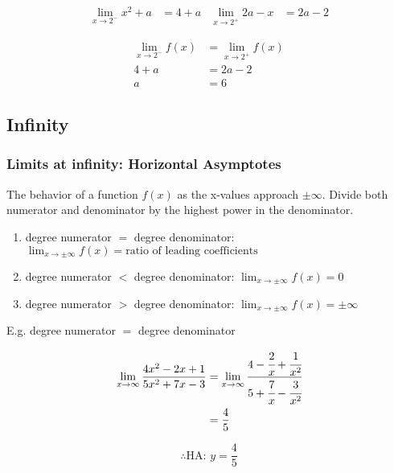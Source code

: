 \documentclass{article}
\begin{document}
\bigskip

\begin{align*}
    \lim_{x \to 2^{-}} x^{2} + a & = 4 + a & \lim_{x \to 2^{+}} 2a - x & = 2a - 2
\end{align*}

\begin{align*}
    \lim_{x \to 2^{-}} f(x) & = \lim_{x \to 2^{+}} f(x) \\
    4 + a                   & = 2a -2                   \\
    a                       & = 6
\end{align*}

\clearpage

\subsection{Infinity}

\subsubsection{Limits at infinity: Horizontal Asymptotes}

The behavior of a function $f(x)$ as the x-values approach $\pm\infty$. Divide both numerator and denominator by the highest power in the denominator.

\begin{enumerate}
    \item degree numerator $=$ degree denominator: $\displaystyle \lim_{x \to \pm \infty} f(x) = \text{ratio of leading coefficients}$
    \item degree numerator $<$ degree denominator: $\displaystyle \lim_{x \to \pm \infty} f(x) = 0$
    \item degree numerator $>$ degree denominator: $\displaystyle \lim_{x \to \pm \infty} f(x) = \pm \infty$
\end{enumerate}

\bigskip

\noindent E.g. degree numerator $=$ degree denominator

\begin{align*}
    \lim_{x \to \infty} \frac{4x^{2} - 2x + 1}{5x^{2} + 7x - 3} & =
    \lim_{x \to \infty} \cfrac{4 - \cfrac{2}{x} + \cfrac{1}{x^{2}}}{5 + \cfrac{7}{x} - \cfrac{3}{x^{2}}} \\
                                                                & = \frac{4}{5}
\end{align*}

\begin{equation*}
    \therefore \text{HA: } y = \frac{4}{5}
\end{equation*}
\end{document}

